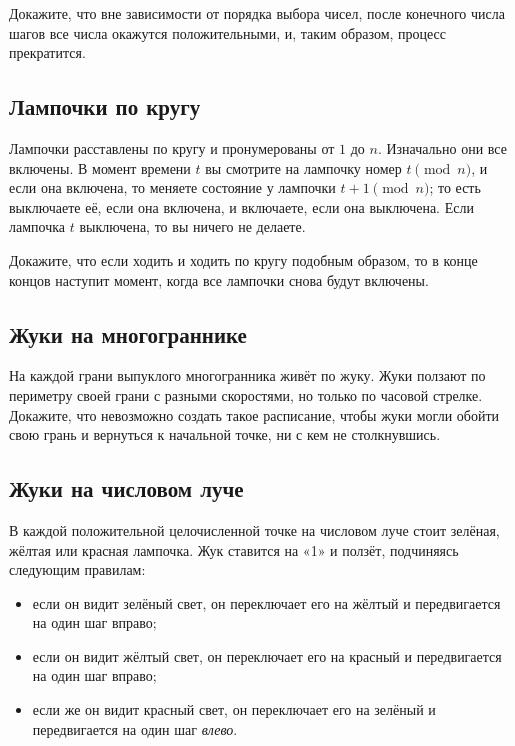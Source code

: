 Докажите, что вне зависимости от порядка выбора чисел, после конечного числа шагов все числа окажутся положительными, и, таким образом, процесс прекратится.

\subsection*{Лампочки по кругу}%

Лампочки расставлены по кругу и пронумерованы от $1$ до $n$.
Изначально они все включены.
В момент времени $t$ вы смотрите на лампочку номер $t \pmod{n}$, и если она включена, то меняете состояние у лампочки $t + 1 \pmod{n}$;
то есть выключаете её, если она включена, и включаете, если она выключена.
Если лампочка $t$ выключена, то вы ничего не делаете.

Докажите, что если ходить и ходить по кругу подобным образом, то в конце концов наступит момент, когда все лампочки снова будут включены.

\subsection*{Жуки на многограннике}%

На каждой грани выпуклого многогранника живёт по жуку.
Жуки ползают по периметру своей грани с разными скоростями, но только по часовой стрелке.
Докажите, что невозможно создать такое расписание, чтобы жуки могли обойти свою грань и вернуться к начальной точке, ни с кем не столкнувшись.

\subsection*{Жуки на числовом луче}%

В каждой положительной целочисленной точке на числовом луче стоит зелёная, жёлтая или красная лампочка.
Жук ставится на «1» и ползёт, подчиняясь следующим правилам:
\begin{itemize}
\item если он видит зелёный свет, он переключает его на жёлтый и передвигается на один шаг вправо; 
\item если он видит жёлтый свет, он переключает его на красный и передвигается на один шаг вправо; 
\item если же он видит красный свет, он переключает его на зелёный и передвигается на один шаг \emph{влево}.
\end{itemize}

